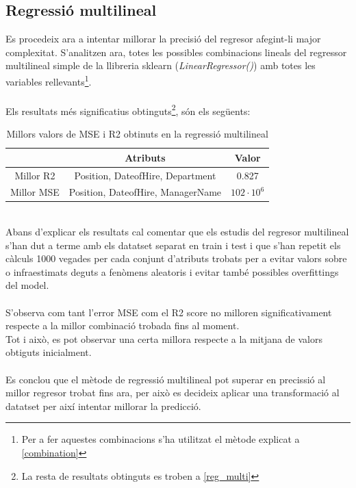 \documentclass[a4paper, 11pt]{article}
\begin{document}
\subsection{Regressió multilineal}
Es procedeix ara a intentar millorar la precisió del regresor afegint-li major complexitat. S'analitzen ara, totes les possibles combinacions lineals del regressor multilineal simple de la llibreria sklearn (\textit{LinearRegressor()}) amb totes les variables rellevants\footnote{Per a fer aquestes combinacions s'ha utilitzat el mètode explicat a \textcolor{blue}{\ref{combination}}}.\\\\
Els resultats més significatius obtinguts\footnote{La resta de resultats obtinguts es troben a \textcolor{blue}{\ref{reg_multi}}}, són els següents:
\begin{table}[h]
    \centering
    \begin{tabular}{c||c|c}
        \cellcolor{white}{} & Atributs & Valor \\ \hline \hline
        Millor R2 & Position, DateofHire, Department & 0.827 \\ \hline
        Millor MSE & Position, DateofHire, ManagerName & $102\cdot 10^6$
    \end{tabular}
    \caption{Millors valors de MSE i R2 obtinuts en la regressió multilineal}
    \label{tab:my_label}
\end{table}\\Abans d'explicar els resultats cal comentar que els estudis del regresor multilineal s'han dut a terme amb els datatset separat en train i test i que s'han repetit els càlculs 1000 vegades per cada conjunt d'atributs trobats per a evitar valors sobre o infraestimats deguts a fenòmens aleatoris i evitar també possibles overfittings del model.\\\\
S'observa com tant l'error MSE com el R2 score no milloren significativament respecte a la millor combinació trobada fins al moment.\\
Tot i això, es pot observar una certa millora respecte a la mitjana de valors obtiguts inicialment.\\\\
Es conclou que el mètode de regressió multilineal pot superar en precissió al millor regresor trobat fins ara, per això es decideix aplicar una transformació al datatset per així intentar millorar la predicció.
\end{document}
